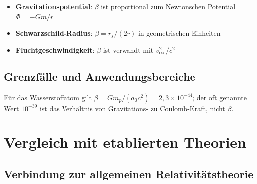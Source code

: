 	\begin{itemize}
		\item \textbf{Gravitationspotential}: $\beta$ ist proportional zum Newtonschen Potential $\Phi = -Gm/r$
		\item \textbf{Schwarzschild-Radius}: $\beta = r_s/(2r)$ in geometrischen Einheiten
		\item \textbf{Fluchtgeschwindigkeit}: $\beta$ ist verwandt mit $v_{\text{esc}}^2/c^2$
	\end{itemize}
	
	\subsection{Grenzfälle und Anwendungsbereiche}
	\label{subsec:limiting_cases}
	
	\begin{table}[htbp]
		\centering
		\caption{Typische $\beta$-Werte für verschiedene physikalische Systeme}
		\label{tab:beta_values}
	\end{table}
	Für das Wasserstoffatom gilt $\beta = G m_p/(a_0 c^2) = 2{,}3 \times 10^{-44}$; der oft genannte Wert $10^{-39}$ ist das Verhältnis von Gravitations- zu Coulomb-Kraft, nicht $\beta$.
	
	\section{Vergleich mit etablierten Theorien}
	\label{sec:theory_comparison}
	
	\subsection{Verbindung zur allgemeinen Relativitätstheorie}
	\label{subsec:gr_connection}
	
